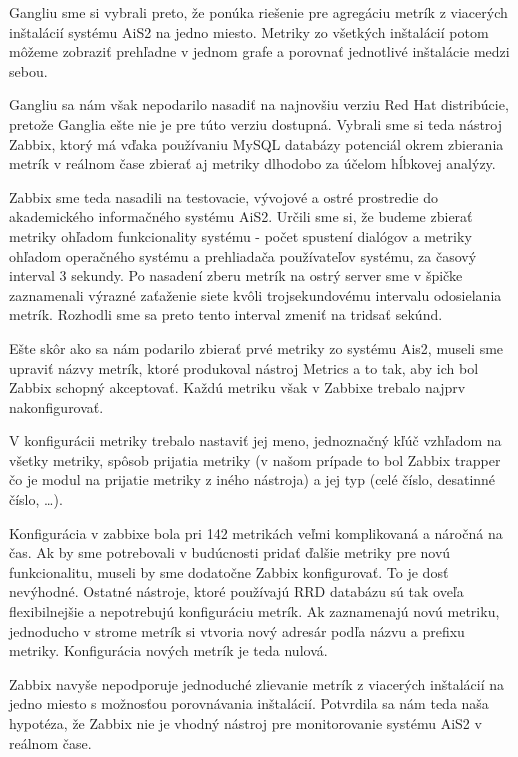 \documentclass[a4paper, upjsfrontpage, thesismargins, thesislinespacing]{rnthesis}
\begin{document}
Gangliu sme si vybrali preto, že ponúka riešenie pre agregáciu metrík z viacerých inštalácií systému AiS2 na jedno miesto.
Metriky zo všetkých inštalácií potom môžeme zobraziť prehľadne v jednom grafe a porovnať jednotlivé inštalácie medzi sebou.

Gangliu sa nám však nepodarilo nasadiť na najnovšiu verziu Red Hat distribúcie, pretože Ganglia ešte nie je pre túto verziu dostupná.
Vybrali sme si teda nástroj Zabbix, ktorý má vďaka používaniu MySQL databázy potenciál okrem zbierania metrík v reálnom čase zbierať aj metriky dlhodobo za účelom hĺbkovej analýzy. 

Zabbix sme teda nasadili na testovacie, vývojové a ostré prostredie do akademického informačného systému AiS2.
Určili sme si, že budeme zbierať metriky ohľadom funkcionality systému - počet spustení dialógov a metriky ohľadom operačného systému a prehliadača používateľov systému, za časový interval 3 sekundy.
Po nasadení zberu metrík na ostrý server sme v špičke zaznamenali výrazné zaťaženie siete kvôli trojsekundovému intervalu odosielania metrík.
Rozhodli sme sa preto tento interval zmeniť na tridsať sekúnd.

Ešte skôr ako sa nám podarilo zbierať prvé metriky zo systému Ais2, 
	museli sme upraviť názvy metrík, ktoré produkoval nástroj Metrics a to tak, aby ich bol Zabbix schopný akceptovať.
Každú metriku však v Zabbixe trebalo najprv nakonfigurovať.

V konfigurácii metriky trebalo nastaviť jej meno, 
	jednoznačný kľúč vzhľadom na všetky metriky, 
	spôsob prijatia metriky (v našom prípade to bol Zabbix trapper čo je modul na prijatie metriky z iného nástroja) a jej typ (celé číslo, desatinné číslo, \ldots).

Konfigurácia v zabbixe bola pri 142 metrikách veľmi komplikovaná a náročná na čas.
Ak by sme potrebovali v budúcnosti pridať ďalšie metriky pre novú funkcionalitu, museli by sme dodatočne Zabbix konfigurovať.
To je dosť nevýhodné.
Ostatné nástroje, ktoré používajú RRD databázu sú tak oveľa flexibilnejšie a nepotrebujú konfiguráciu metrík.
Ak zaznamenajú novú metriku, jednoducho v strome metrík si vtvoria nový adresár podľa názvu a prefixu metriky.
Konfigurácia nových metrík je teda nulová.

Zabbix navyše nepodporuje jednoduché zlievanie metrík z viacerých inštalácií na jedno miesto s možnosťou porovnávania inštalácií.
Potvrdila sa nám teda naša hypotéza, že Zabbix nie je vhodný nástroj pre monitorovanie systému AiS2 v reálnom čase.
\end{document}
